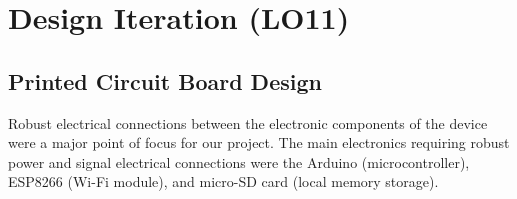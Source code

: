 \documentclass[12pt]{article}
\begin{document}




\section{Design Iteration (LO11)}


\subsection{Printed Circuit Board Design}
Robust electrical connections between the electronic components of the device were a major point of focus for our project. The main electronics requiring robust power and signal electrical connections were the Arduino (microcontroller), ESP8266 (Wi-Fi module), and micro-SD card (local memory storage). \\
\end{document}
